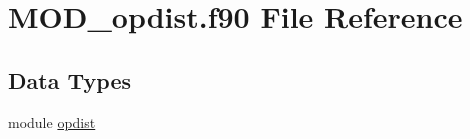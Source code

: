 \hypertarget{MOD__opdist_8f90}{\section{M\-O\-D\-\_\-opdist.\-f90 File Reference}
\label{MOD__opdist_8f90}
}
\subsection*{Data Types}
\begin{DoxyCompactItemize}
\item 
module \hyperlink{classopdist}{opdist}
\end{DoxyCompactItemize}
